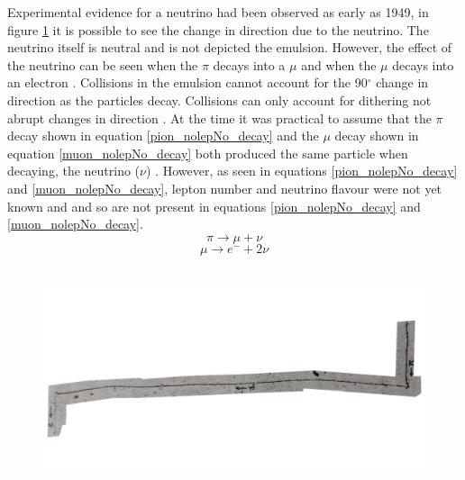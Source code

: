 Experimental evidence for a neutrino had been observed as early as 1949, in figure \ref{pion_path} it is possible to see the change in direction due to the neutrino. The neutrino itself is neutral and is not depicted the emulsion. However, the effect of the neutrino can be seen when the $\pi$ decays into a $\mu$ and when the $\mu$ decays into an electron \cite{griffiths2008book} \cite{griffiths2008neutrino1.5}. Collisions in the emulsion cannot account for the 90$^\circ$ change in direction as the particles decay. Collisions can only account for dithering not abrupt changes in direction \cite{griffiths2008book} \cite{griffiths2008neutrino1.5}. At the time it was practical to assume that the $\pi$ decay shown in equation \ref{pion_nolepNo_decay} and the $\mu$ decay shown in equation \ref{muon_nolepNo_decay} both produced the same particle when decaying, the neutrino ($\nu$) \cite{griffiths2008book} \cite{griffiths2008neutrino1.5}. However, as seen in equations \ref{pion_nolepNo_decay} and \ref{muon_nolepNo_decay}, lepton number and neutrino flavour were not yet known and and so are not present in equations \ref{pion_nolepNo_decay} and \ref{muon_nolepNo_decay}.
\begin{equation}
    \pi \rightarrow \mu + \nu
    \label{pion_nolepNo_decay}
\end{equation}
\begin{equation}
    \mu \rightarrow e^- + 2\nu
    \label{muon_nolepNo_decay}
\end{equation}
\\
\begin{figure}[!h]
 \centering
 \includegraphics[width=0.8\linewidth]{Chapter1/Figs/Raster/neutrinoInChamberRotated90.png}
 \label{pion_path}
\end{figure}
